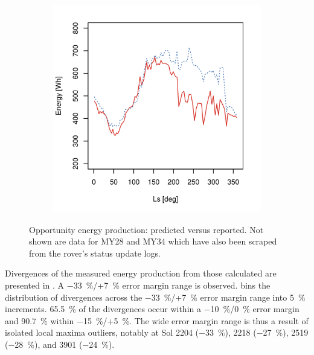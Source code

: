\begin{figure}[h]
\begin{subfigure}[t]{\subfigureWidth}
  		\label{fig:plot:sub:mer-energy-production-predicted-vs-reported-my32}
  	\end{subfigure}\hfill
	   \begin{subfigure}[t]{\subfigureWidth}
      \centering
  		\includegraphics[height=\graphicsHeight]{sections/mars-solar-energy/photovoltaic-energy/plots/predicted-vs-measured-energy-my33.png}
  		\label{fig:plot:sub:mer-energy-production-predicted-vs-reported-my33}
	   \end{subfigure}\hfill
    \caption[Opportunity energy production: predicted versus reported]
            {Opportunity energy production: predicted versus reported. Not shown are data for \ac{MY}28 and \ac{MY}34 which have also been scraped from the rover's status update logs.}
	\label{fig:plot:mer-energy-production-predicted-vs-reported}
\vspace{-2ex}
\end{figure}

\clearpage
Divergences of the measured energy production from those calculated are presented in . A \SI{-33}{\percent}/+\SI{7}{\percent} error margin range is observed.  bins the distribution of divergences across the \SI{-33}{\percent}/+\SI{7}{\percent} error margin range into \SI{5}{\percent} increments. \SI{65.5}{\percent} of the divergences occur within a \SI{-10}{\percent}/\SI{0}{\percent} error margin and \SI{90.7}{\percent} within \SI{-15}{\percent}/+\SI{5}{\percent}. The wide error margin range is thus a result of isolated local maxima outliers, notably at Sol 2204 (\SI{-33}{\percent}), 2218 (\SI{-27}{\percent}), 2519 (\SI{-28}{\percent}), and 3901 (\SI{-24}{\percent}).

